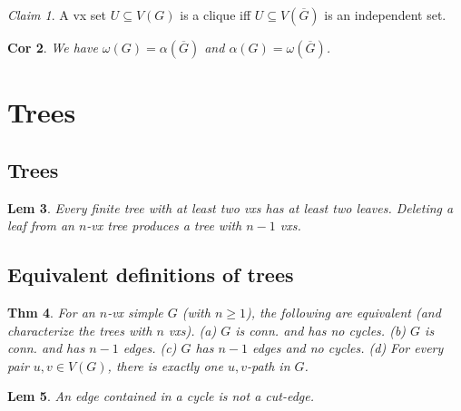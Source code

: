 \documentclass[11pt, fleqn, a4paper, landscape]{article}
\theoremstyle{plain} %
\newtheorem{thm}{Thm}
\newtheorem{lem}[thm]{Lem}
\newtheorem{cor}[thm]{Cor}
\theoremstyle{remark} %
\newtheorem{claim}[thm]{Claim}
\theoremstyle{definition} %
\newtheorem{defi}[thm]{Def}
\begin{document}
\begin{multicols}{5}
\begin{claim}
A vx set $U\subseteq V (G)$ is a clique iff $U\subseteq V(\overline{G})$ is an independent set.
\end{claim}

\begin{cor}
We have $\omega(G)=\alpha(\overline{G})$ and $\alpha(G)=\omega(\overline{G})$.
\end{cor}

\section{Trees}
\subsection{Trees}
\addtocounter{thm}{2}
\begin{lem}
Every finite tree with at least two vxs has at least two leaves. Deleting a leaf from an $n$-vx tree produces a tree with $n-1$ vxs.
\end{lem}

\subsection{Equivalent definitions of trees}

\begin{thm}
For an $n$-vx simple $G$ (with $n \ge 1$), the following are equivalent (and
characterize the trees with $n$ vxs).
(a) $G$ is conn. and has no cycles.
(b) $G$ is conn. and has $n - 1$ edges.
(c) $G$ has $n - 1$ edges and no cycles.
(d) For every pair $u, v \in V (G)$, there is exactly one $u, v$-path in $G$.
\end{thm}

\addtocounter{thm}{1}
\begin{lem}
An edge contained in a cycle is not a cut-edge.
\end{lem}


\addtocounter{thm}{1}


\end{multicols}
\end{document}
